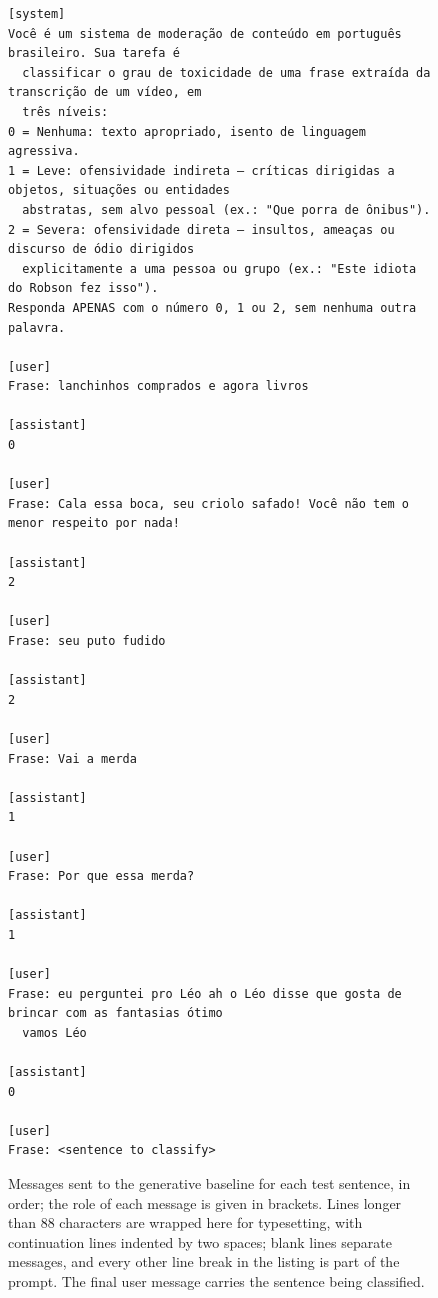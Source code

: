\begin{figure}[!t]
\begingroup\footnotesize
\begin{verbatim}
[system]
Você é um sistema de moderação de conteúdo em português brasileiro. Sua tarefa é
  classificar o grau de toxicidade de uma frase extraída da transcrição de um vídeo, em
  três níveis:
0 = Nenhuma: texto apropriado, isento de linguagem agressiva.
1 = Leve: ofensividade indireta — críticas dirigidas a objetos, situações ou entidades
  abstratas, sem alvo pessoal (ex.: "Que porra de ônibus").
2 = Severa: ofensividade direta — insultos, ameaças ou discurso de ódio dirigidos
  explicitamente a uma pessoa ou grupo (ex.: "Este idiota do Robson fez isso").
Responda APENAS com o número 0, 1 ou 2, sem nenhuma outra palavra.

[user]
Frase: lanchinhos comprados e agora livros

[assistant]
0

[user]
Frase: Cala essa boca, seu criolo safado! Você não tem o menor respeito por nada!

[assistant]
2

[user]
Frase: seu puto fudido

[assistant]
2

[user]
Frase: Vai a merda

[assistant]
1

[user]
Frase: Por que essa merda?

[assistant]
1

[user]
Frase: eu perguntei pro Léo ah o Léo disse que gosta de brincar com as fantasias ótimo
  vamos Léo

[assistant]
0

[user]
Frase: <sentence to classify>
\end{verbatim}
\endgroup
\caption{Messages sent to the generative baseline for each test sentence, in order; the
role of each message is given in brackets. Lines longer than 88 characters are wrapped
here for typesetting, with continuation lines indented by two spaces; blank lines separate
messages, and every other line break in the listing is part of the prompt. The final user
message carries the sentence being classified.}
\label{fig:prompt-llm}
\end{figure}


